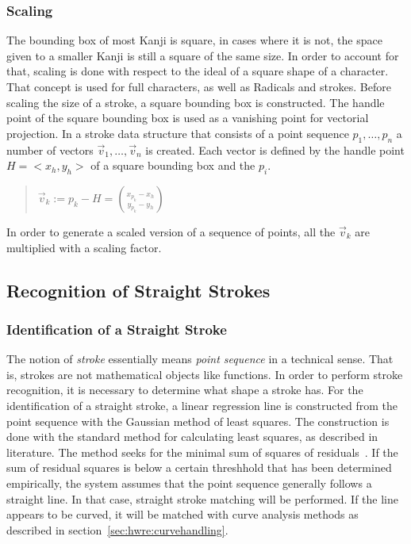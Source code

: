 \subsubsection{Scaling}
\label{sec:hwre:scaling}

The bounding box of most Kanji is square, in cases where it is not,
the space given to a smaller Kanji is still a square of the same size.
In order to account for that, scaling is done with respect to the ideal of a 
square shape of a character. That concept is used for full characters, as well
as Radicals and strokes.
Before scaling the size of a stroke, a square bounding box is constructed.
The handle point of the square bounding box is used as a vanishing point for
vectorial projection. In a stroke data structure that consists of a point
sequence \(p_1, \ldots, p_n\)  a number of vectors 
\(\vec{v}_1, \ldots, \vec{v}_n\) is created. Each vector is defined by the
handle point \(H = <x_h, y_h>\) of a square bounding box and the \(p_i\).
\begin{quote}
\(
  \vec{v}_k := p_k-H = \binom{x_{p_k}-x_h}{y_{p_k}-y_h}
\)
\end{quote}
In order to generate a scaled version of a sequence of points, 
all the \(\vec{v}_k\) are multiplied with a scaling factor.


\subsection{Recognition of Straight Strokes}
\label{sec:hwre:straightstrokes}

\subsubsection{Identification of a Straight Stroke}
\label{sec:hwre:identificationstraightstroke}

The notion of \emph{stroke} essentially means \emph{point sequence} in a 
technical sense. That is, strokes are not mathematical objects like functions.
In order to perform stroke recognition, it is necessary to determine what shape 
a stroke has. For the identification of a straight stroke, a linear regression 
line is constructed from the point sequence with the Gaussian method of 
least squares. The construction is done with the standard method for 
calculating least squares, as described in literature. The method seeks for the 
minimal sum of squares of residuals~. 
If the sum of residual squares is below 
a certain threshhold %
that has been determined empirically, %
the system assumes that the point 
sequence generally follows a straight line. In that case, straight stroke 
matching will be performed. If the line appears to be curved, it will be matched
with curve analysis methods as described in 
section~\ref{sec:hwre:curvehandling}. 

